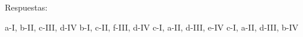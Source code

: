 \documentclass[12pt, letter]{exam}
\begin{document}
\begin{questions}
\begin{multicols}{2}
    \end{multicols}
    
    \vspace*{0.25cm}
    Respuestas:
    \begin{multicols}{2}
    \begin{tasks}
        \task a-I, b-II, c-III, d-IV
        \task b-I, c-II, f-III, d-IV
        \task c-I, a-II, d-III, e-IV
        \task c-I, a-II, d-III, b-IV
    \end{tasks}
    \end{multicols}

    \newpage


\end{questions}
\end{document}
